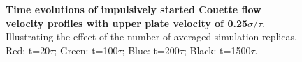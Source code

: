 \documentclass[preprint,12pt]{elsarticle}
\begin{document}


\begin{figure}
\centering
{}
\hskip 1cm
\vskip-0.2cm
\caption[]{\small {\bf Time evolutions of impulsively started Couette flow velocity profiles with upper plate velocity of 0.25$\sigma/\tau$}. 
Illustrating the effect of the number of averaged simulation replicas. Red: t=20$\tau$; Green: t=100$\tau$; Blue: t=200$\tau$; Black: t=1500$\tau$.
}
\label{multiple_couette}
\end{figure}
\end{document}
